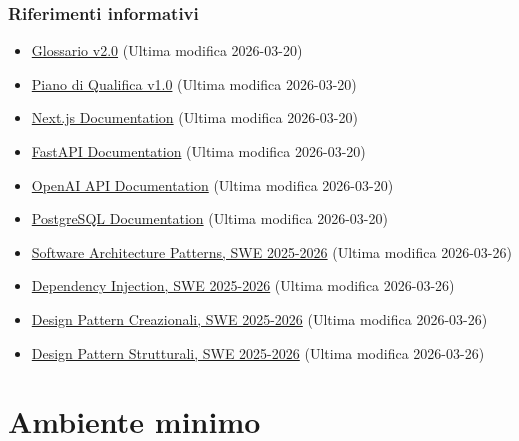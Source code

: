 \documentclass[a4paper, 11pt, oneside]{scrartcl}
\begin{document}
\subsubsection{Riferimenti informativi}
\begin{itemize}
    \item \href{https://swenightpro.github.io/Documentazione/docs/RTB/Documentazione%20Esterna/Glossario_v2.0.pdf}{Glossario v2.0} (Ultima modifica 2026-03-20)
    \item \href{https://swenightpro.github.io/Documentazione/docs/RTB/Documentazione%20Esterna/Piano_di_Qualifica_v1.0.pdf}{Piano di Qualifica v1.0} (Ultima modifica 2026-03-20)
    \item \href{https://nextjs.org/docs}{Next.js Documentation} (Ultima modifica 2026-03-20)
    \item \href{https://fastapi.tiangolo.com/}{FastAPI Documentation} (Ultima modifica 2026-03-20)
    \item \href{https://platform.openai.com/docs}{OpenAI API Documentation} (Ultima modifica 2026-03-20)
    \item \href{https://www.postgresql.org/docs/}{PostgreSQL Documentation} (Ultima modifica 2026-03-20)
    \item \href{https://www.math.unipd.it/~rcardin/swea/2022/Software%20Architecture%20Patterns.pdf}{Software Architecture Patterns, SWE 2025-2026} (Ultima modifica 2026-03-26)
    \item \href{https://www.math.unipd.it/~rcardin/swea/2022/Design%20Pattern%20Architetturali%20-%20Dependency%20Injection.pdf}{Dependency Injection, SWE 2025-2026} (Ultima modifica 2026-03-26)
    \item \href{https://www.math.unipd.it/~rcardin/swea/2022/Design%20Pattern%20Creazionali.pdf}{Design Pattern Creazionali, SWE 2025-2026} (Ultima modifica 2026-03-26)
    \item \href{https://www.math.unipd.it/~rcardin/swea/2022/Design%20Pattern%20Strutturali.pdf}{Design Pattern Strutturali, SWE 2025-2026} (Ultima modifica 2026-03-26)

\end{itemize}

\newpage
\section{Ambiente minimo}
\end{document}
